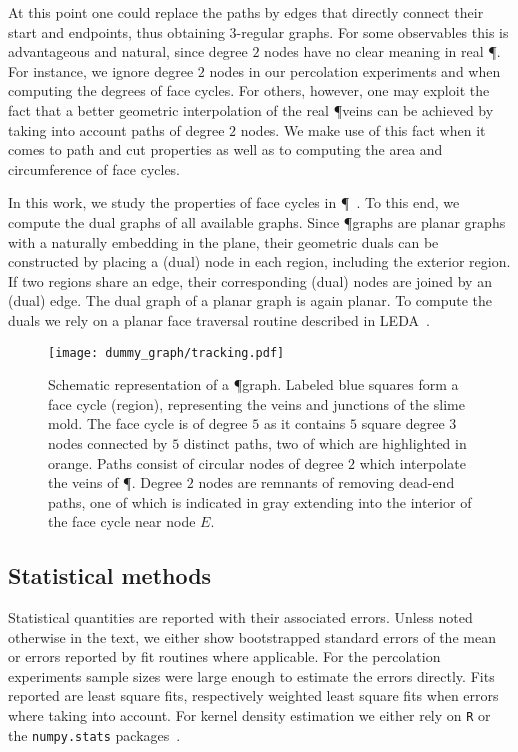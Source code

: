 		At this point one could replace the paths by edges that directly connect their start and endpoints, thus obtaining $3$-regular graphs. For some observables this is advantageous and natural, since degree $2$ nodes have no clear meaning in real \P. For instance, we ignore degree $2$ nodes in our percolation experiments and when computing the degrees of face cycles. For others, however, one may exploit the fact that a better geometric interpolation of the real \P veins can be achieved by taking into account paths of degree $2$ nodes. We make use of this fact when it comes to path and cut properties as well as to computing the area and circumference of face cycles.

		In this work, we study the properties of face cycles in \P~\cite{mehlhorn1995leda}. To this end, we compute the dual graphs of all available graphs. Since \P graphs are planar graphs with a naturally embedding in the plane, their geometric duals can be constructed by placing a (dual) node in each region, including the exterior region. If two regions share an edge, their corresponding (dual) nodes are joined by an (dual) edge. The dual graph of a planar graph is again planar. To compute the duals we rely on a planar face traversal routine described in LEDA~\cite{mehlhorn1995leda}.

		\begin{figure}[!htbp]
			\centering
			
			\texttt{[image: dummy\_graph/tracking.pdf]}

			\caption[Schematic representation of a \P graph.]{Schematic representation of a \P graph. Labeled blue squares form a face cycle (region), representing the veins and junctions of the slime mold. The face cycle is of degree $5$ as it contains $5$ square degree $3$ nodes connected by $5$ distinct paths, two of which are highlighted in orange. Paths consist of circular nodes of degree $2$ which interpolate the veins of \P. Degree $2$ nodes are remnants of removing dead-end paths, one of which is indicated in gray extending into the interior of the face cycle near node $E$.}
			\label{fig:graph_schematic}
		\end{figure}

	\subsection{Statistical methods}

		Statistical quantities are reported with their associated errors. Unless noted otherwise in the text, we either show bootstrapped standard errors of the mean or errors reported by fit routines where applicable. For the percolation experiments sample sizes were large enough to estimate the errors directly. Fits reported are least square fits, respectively weighted least square fits when errors where taking into account. For kernel density estimation we either rely on \verb+R+ or the \verb+numpy.stats+ packages~\cite{team2013r,jones2001open}.

